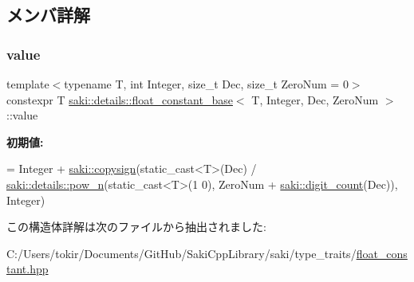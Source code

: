 \subsection{メンバ詳解}
\mbox{\label{structsaki_1_1details_1_1float__constant__base_a7c1fcb103a7419a7812cf095f1ffff61}} 
\subsubsection{\texorpdfstring{value}{value}}
{\footnotesize\ttfamily template$<$typename T, int Integer, size\+\_\+t Dec, size\+\_\+t Zero\+Num = 0$>$ \\
constexpr T \mbox{\hyperlink{structsaki_1_1details_1_1float__constant__base}{saki\+::details\+::float\+\_\+constant\+\_\+base}}$<$ T, Integer, Dec, Zero\+Num $>$\+::value\hspace{0.3cm}{\ttfamily [static]}}

{\bfseries 初期値\+:}
\begin{DoxyCode}
= Integer +
                               \mbox{\hyperlink{namespacesaki_a8bab6303ac2144b883080f04ebe26a0e}{saki::copysign}}(static\_cast<T>(Dec) /
                                                  \mbox{\hyperlink{namespacesaki_1_1details_a30b4cd78c970618ee2886123c28e4041}{saki::details::pow\_n}}(static\_cast<T>(1
      0),
                                                                       ZeroNum + 
      \mbox{\hyperlink{namespacesaki_a467dee57b7bbe101146713a82acfe95e}{saki::digit\_count}}(Dec)),
                                              Integer)
\end{DoxyCode}


この構造体詳解は次のファイルから抽出されました\+:\begin{DoxyCompactItemize}
\item 
C\+:/\+Users/tokir/\+Documents/\+Git\+Hub/\+Saki\+Cpp\+Library/saki/type\+\_\+traits/\mbox{\hyperlink{float__constant_8hpp}{float\+\_\+constant.\+hpp}}\end{DoxyCompactItemize}
